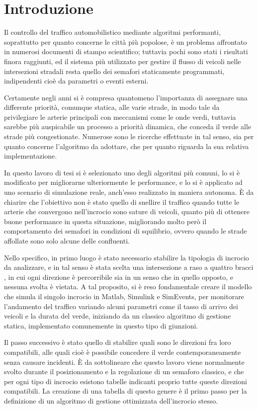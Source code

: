 \chapter*{Introduzione}
Il controllo del traffico automobilistico mediante algoritmi performanti, soprattutto per quanto concerne le città più popolose, è un problema affrontato in numerosi documenti di stampo scientifico; tuttavia pochi sono stati i risultati finora raggiunti, ed il sistema più utilizzato per gestire il flusso di veicoli nelle intersezioni stradali resta quello dei semafori staticamente programmati, indipendenti cioè da parametri o eventi esterni.

Certamente negli anni si è compresa quantomeno l’importanza di assegnare una differente priorità, comunque statica, alle varie strade, in modo tale da privilegiare le arterie principali con meccanismi come le onde verdi, tuttavia sarebbe più auspicabile un processo a priorità dinamica, che conceda il verde alle strade più congestionate. Numerose sono le ricerche effettuate in tal senso, sia per quanto concerne l’algoritmo da adottare, che per quanto riguarda la sua relativa implementazione.

In questo lavoro di tesi si è selezionato uno degli algoritmi più comuni, lo si è modificato per migliorarne ulteriormente le performance, e lo si è applicato ad uno scenario di simulazione reale, anch’esso realizzato in maniera autonoma. È da chiarire che l’obiettivo non è stato quello di snellire il traffico quando tutte le arterie che convergono nell’incrocio sono sature di veicoli, quanto più di ottenere buone performance in questa situazione, migliorando molto però il comportamento dei semafori in condizioni di squilibrio, ovvero quando le strade affollate sono solo alcune delle confluenti.

Nello specifico, in primo luogo è stato necessario stabilire la tipologia di incrocio da analizzare, e in tal senso è stata scelta una intersezione a raso a quattro bracci \cite{incrocio}, in cui ogni direzione è percorribile sia in un senso che in quello opposto, e nessuna svolta è vietata. A tal proposito, si è reso fondamentale creare il modello che simula il singolo incrocio in Matlab, Simulink e SimEvents, per monitorare l’andamento del traffico variando alcuni parametri come il tasso di arrivo dei veicoli e la durata del verde, iniziando da un classico algoritmo di gestione statica, implementato comunemente in questo tipo di giunzioni.

Il passo successivo è stato quello di stabilire quali sono le direzioni fra loro compatibili, alle quali cioè è possibile concedere il verde contemporaneamente senza causare incidenti. È da sottolineare che questo lavoro viene normalmente svolto durante il posizionamento e la regolazione di un semaforo classico, e che per ogni tipo di incrocio esistono tabelle indicanti proprio tutte queste direzioni compatibili. La creazione di una tabella di questo genere è il primo passo per la definizione di un algoritmo di gestione ottimizzata dell’incrocio stesso.

